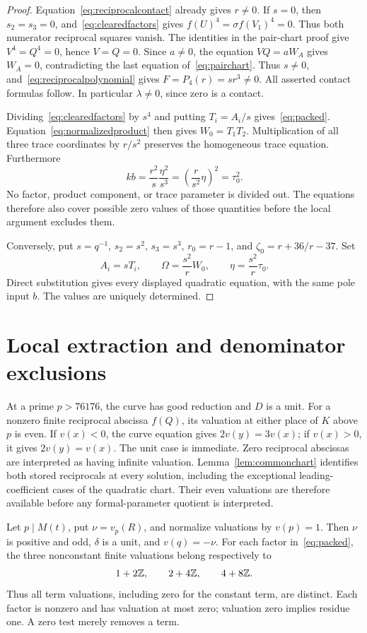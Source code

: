\documentclass[11pt,a4paper]{article}
\begin{document}
\begin{proof}
Equation~\eqref{eq:reciprocalcontact} already gives $r\ne0$.
If $s=0$, then $s_2=s_3=0$, and~\eqref{eq:clearedfactors} gives
$f(U)^4=\sigma f(V_1)^4=0$. Thus both numerator reciprocal squares
vanish. The identities in the pair-chart proof give $V^4=Q^4=0$,
hence $V=Q=0$. Since $a\ne0$, the equation $VQ=aW_A$ gives
$W_A=0$, contradicting the last equation of~\eqref{eq:pairchart}.
Thus $s\ne0$, and~\eqref{eq:reciprocalpolynomial} gives
$F=P_4(r)=sr^3\ne0$. All asserted contact formulas follow.
In particular $\lambda\ne0$, since zero is a contact.

Dividing~\eqref{eq:clearedfactors} by $s^4$ and putting $T_i=A_i/s$
gives~\eqref{eq:packed}. Equation~\eqref{eq:normalizedproduct}
then gives $W_0=T_1T_2$. Multiplication of all three trace coordinates
by $r/s^2$ preserves the homogeneous trace equation. Furthermore
\[
 kb=\frac{r^2}s\frac{\eta^2}{s^3}
    =\left(\frac r{s^2}\eta\right)^2=\tau_0^2.
\]
No factor, product component, or trace parameter is divided out.
The equations therefore also cover possible zero values of those
quantities before the local argument excludes them.

Conversely, put $s=q^{-1}$, $s_2=s^2$, $s_3=s^3$,
$r_0=r-1$, and $\zeta_0=r+36/r-37$. Set
\[
 A_i=sT_i,\qquad \Omega=\frac{s^2}rW_0,
 \qquad \eta=\frac{s^2}r\tau_0.
\]
Direct substitution gives every displayed quadratic equation, with
the same pole input $b$. The values are uniquely determined.
\end{proof}

\section{Local extraction and denominator exclusions}

At a prime $p>76176$, the curve has good reduction and $D$ is a unit.
For a nonzero finite reciprocal abscissa $f(Q)$, its valuation at
either place of $K$ above $p$ is even. If $v(x)<0$, the curve equation
gives $2v(y)=3v(x)$; if $v(x)>0$, it gives $2v(y)=v(x)$.
The unit case is immediate. Zero reciprocal abscissas are interpreted
as having infinite valuation.
Lemma~\ref{lem:commonchart} identifies both stored reciprocals at every
solution, including the exceptional leading-coefficient cases of the
quadratic chart. Their even valuations are therefore available before
any formal-parameter quotient is interpreted.

Let $p\mid M(t)$, put $\nu=v_p(R)$, and normalize valuations by
$v(p)=1$. Then $\nu$ is positive and odd, $\delta$ is a unit, and
$v(q)=-\nu$. For each factor in~\eqref{eq:packed}, the three
nonconstant finite valuations belong respectively to
\[
                     1+2\mathbb Z,\qquad 2+4\mathbb Z,\qquad4+8\mathbb Z.
\]
Thus all term valuations, including zero for the constant term, are
distinct. Each factor is nonzero and has valuation at most zero;
valuation zero implies residue one. A zero test merely removes a term.
\end{document}
